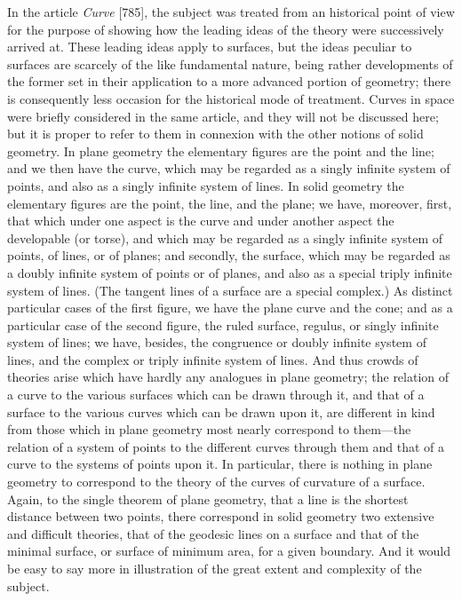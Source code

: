 \documentclass[11pt,a4paper]{article}
\begin{document}
In the article \textit{Curve} [785], the subject was treated from an historical point of view for the purpose of showing how the leading ideas of the theory were successively arrived at. These leading ideas apply to surfaces, but the ideas peculiar to surfaces are scarcely of the like fundamental nature, being rather developments of the former set in their application to a more advanced portion of geometry; there is consequently less occasion for the historical mode of treatment. Curves in space were briefly considered in the same article, and they will not be discussed here; but it is proper to refer to them in connexion with the other notions of solid geometry. In plane geometry the elementary figures are the point and the line; and we then have the curve, which may be regarded as a singly infinite system of points, and also as a singly infinite system of lines. In solid geometry the elementary figures are the point, the line, and the plane; we have, moreover, first, that which under one aspect is the curve and under another aspect the developable (or torse), and which may be regarded as a singly infinite system of points, of lines, or of planes; and secondly, the surface, which may be regarded as a doubly infinite system of points or of planes, and also as a special triply infinite system of lines. (The tangent lines of a surface are a special complex.) As distinct particular cases of the first figure, we have the plane curve and the cone; and as a particular case of the second figure, the ruled surface, regulus, or singly infinite system of lines; we have, besides, the congruence or doubly infinite system of lines, and the complex or triply infinite system of lines. And thus crowds of theories arise which have hardly any analogues in plane geometry; the relation of a curve to the various surfaces which can be drawn through it, and that of a surface to the various curves which can be drawn upon it, are different in kind from those which in plane geometry most nearly correspond to them---the relation of a system of points to the different curves through them and that of a curve to the systems of points upon it. In particular, there is nothing in plane geometry to correspond to the theory of the curves of curvature of a surface. Again, to the single theorem of plane geometry, that a line is the shortest distance between two points, there correspond in solid geometry two extensive and difficult theories, that of the geodesic lines on a surface and that of the minimal surface, or surface of minimum area, for a given boundary. And it would be easy to say more in illustration of the great extent and complexity of the subject.
\end{document}
